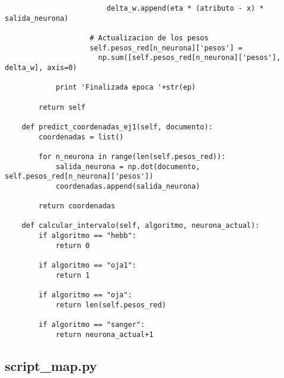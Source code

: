 \begin{changemargin}{-2.0cm}{-1.5cm}
\begin{verbatim}
                        delta_w.append(eta * (atributo - x) * salida_neurona)

                    # Actualizacion de los pesos
                    self.pesos_red[n_neurona]['pesos'] = 
                      np.sum([self.pesos_red[n_neurona]['pesos'], delta_w], axis=0)
            
            print 'Finalizada epoca '+str(ep)

        return self

    def predict_coordenadas_ej1(self, documento):
        coordenadas = list()

        for n_neurona in range(len(self.pesos_red)):
            salida_neurona = np.dot(documento, self.pesos_red[n_neurona]['pesos'])
            coordenadas.append(salida_neurona)

        return coordenadas

    def calcular_intervalo(self, algoritmo, neurona_actual):
        if algoritmo == "hebb":
            return 0
        
        if algoritmo == "oja1":
            return 1

        if algoritmo == "oja":
            return len(self.pesos_red)
        
        if algoritmo == "sanger":
            return neurona_actual+1

\end{verbatim}
\end{changemargin}

\newpage
\subsection{script\_map.py}

